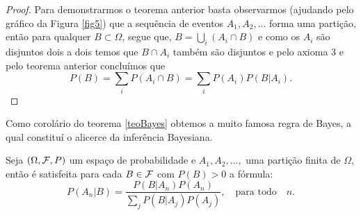 \begin{frame}
 \begin{proof}
Para demonstrarmos o teorema anterior basta observarmos (ajudando pelo gráfico da Figura \ref{fig5}) que a sequência de eventos $ A_1, A_2, \ldots $ forma uma partição, então para qualquer $ B\subset \Omega $, segue que,  $ B=\displaystyle\bigcup_{i}(A_i\cap B) $ e como os $ A_i $ são disjuntos dois a dois temos que $ B\cap A_i $ também são disjuntos e pelo axioma 3 e pelo teorema anterior concluímos que
$$P(B)=\displaystyle \sum_{i}P(A_i\cap B)=\sum_{i}P(A_i)P(B|A_i).$$ 	
\end{proof}




Como corolário do teorema \ref{teoBayes} obtemos a muito famosa regra de Bayes, a qual constituí o alicerce da inferência Bayesiana. 

\begin{corol} Seja $(\Omega ,{\cal F}, P)$ um espaço de probabilidade e $A_{1},A_{2},\ldots,$ uma partição 
finita de $\Omega$, então  é satisfeita para cada
$B\in {\cal F}$  com $P(B)>0$ a fórmula:
$$
P(A_{n}|B)=\frac{P(B|A_{n})P(A_{n})}{\sum_{j}P(B|A_{j})P(A_j)}, \quad \text{para todo} \quad  n.
$$
\end{corol}


\end{frame}

